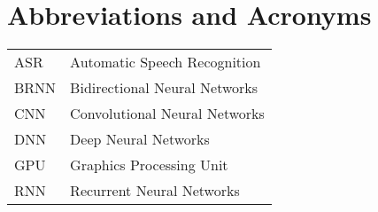 \chapter*{Abbreviations and Acronyms}


\noindent
\begin{longtable}{@{}p{}p{}@{}}
ASR & Automatic Speech Recognition \\
BRNN & Bidirectional Neural Networks\\
CNN & Convolutional Neural Networks\\
DNN & Deep Neural Networks \\ 
GPU & Graphics Processing Unit \\
RNN & Recurrent Neural Networks \\
\end{longtable}
